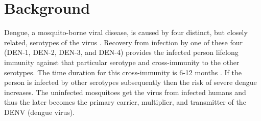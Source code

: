 \documentclass{bmcart}
\begin{document}




\section{Background}
\label{intro}



Dengue, a mosquito-borne viral disease, is caused by four distinct, but closely related, serotypes of the virus \cite{gubler1995dengue,whodenvtype2015}. Recovery from infection by one of these four (DEN-1, DEN-2, DEN-3, and DEN-4) provides the infected person lifelong immunity against that particular serotype and cross-immunity to the other serotypes. The time duration for this cross-immunity is 6-12 months \cite{gubler1995dengue}. If the person is infected by other serotypes subsequently then the risk of severe dengue increases. The uninfected mosquitoes get the virus from infected humans and thus the later becomes the primary carrier, multiplier, and transmitter of the DENV (dengue virus).
\end{document}
